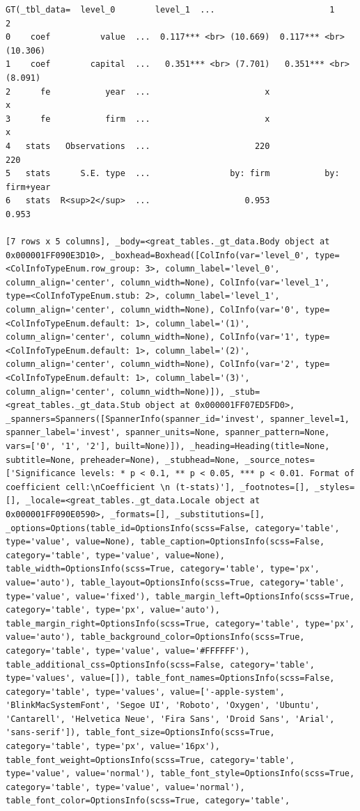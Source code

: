 \documentclass[
  letterpaper,
  DIV=11,
  numbers=noendperiod]{scrreprt}
\begin{document}
\begin{table}
{\begin{verbatim}
GT(_tbl_data=  level_0        level_1  ...                       1                       2
0    coef          value  ...  0.117*** <br> (10.669)  0.117*** <br> (10.306)
1    coef        capital  ...   0.351*** <br> (7.701)   0.351*** <br> (8.091)
2      fe           year  ...                       x                       x
3      fe           firm  ...                       x                       x
4   stats   Observations  ...                     220                     220
5   stats      S.E. type  ...                by: firm           by: firm+year
6   stats  R<sup>2</sup>  ...                   0.953                   0.953

[7 rows x 5 columns], _body=<great_tables._gt_data.Body object at 0x000001FF090E3D10>, _boxhead=Boxhead([ColInfo(var='level_0', type=<ColInfoTypeEnum.row_group: 3>, column_label='level_0', column_align='center', column_width=None), ColInfo(var='level_1', type=<ColInfoTypeEnum.stub: 2>, column_label='level_1', column_align='center', column_width=None), ColInfo(var='0', type=<ColInfoTypeEnum.default: 1>, column_label='(1)', column_align='center', column_width=None), ColInfo(var='1', type=<ColInfoTypeEnum.default: 1>, column_label='(2)', column_align='center', column_width=None), ColInfo(var='2', type=<ColInfoTypeEnum.default: 1>, column_label='(3)', column_align='center', column_width=None)]), _stub=<great_tables._gt_data.Stub object at 0x000001FF07ED5FD0>, _spanners=Spanners([SpannerInfo(spanner_id='invest', spanner_level=1, spanner_label='invest', spanner_units=None, spanner_pattern=None, vars=['0', '1', '2'], built=None)]), _heading=Heading(title=None, subtitle=None, preheader=None), _stubhead=None, _source_notes=['Significance levels: * p < 0.1, ** p < 0.05, *** p < 0.01. Format of coefficient cell:\nCoefficient \n (t-stats)'], _footnotes=[], _styles=[], _locale=<great_tables._gt_data.Locale object at 0x000001FF090E0590>, _formats=[], _substitutions=[], _options=Options(table_id=OptionsInfo(scss=False, category='table', type='value', value=None), table_caption=OptionsInfo(scss=False, category='table', type='value', value=None), table_width=OptionsInfo(scss=True, category='table', type='px', value='auto'), table_layout=OptionsInfo(scss=True, category='table', type='value', value='fixed'), table_margin_left=OptionsInfo(scss=True, category='table', type='px', value='auto'), table_margin_right=OptionsInfo(scss=True, category='table', type='px', value='auto'), table_background_color=OptionsInfo(scss=True, category='table', type='value', value='#FFFFFF'), table_additional_css=OptionsInfo(scss=False, category='table', type='values', value=[]), table_font_names=OptionsInfo(scss=False, category='table', type='values', value=['-apple-system', 'BlinkMacSystemFont', 'Segoe UI', 'Roboto', 'Oxygen', 'Ubuntu', 'Cantarell', 'Helvetica Neue', 'Fira Sans', 'Droid Sans', 'Arial', 'sans-serif']), table_font_size=OptionsInfo(scss=True, category='table', type='px', value='16px'), table_font_weight=OptionsInfo(scss=True, category='table', type='value', value='normal'), table_font_style=OptionsInfo(scss=True, category='table', type='value', value='normal'), table_font_color=OptionsInfo(scss=True, category='table', 
\end{verbatim}}
\end{table}
\end{document}
